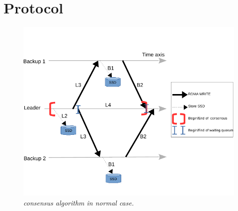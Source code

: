 \section{Protocol} \label{sec:protocol}

\begin{figure}[ht]
\begin{center}
\includegraphics{figures/consensus}
\caption{\em \xxx consensus algorithm in normal case.}\label{fig:consensus}
\end{center}
\end{figure}